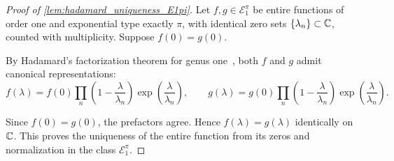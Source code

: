 \begin{proof}[Proof of \cref{lem:hadamard_uniqueness_E1pi}]
Let \( f, g \in \mathcal{E}_1^\pi \) be entire functions of order one and exponential type exactly \( \pi \), with identical zero sets \( \{ \lambda_n \} \subset \mathbb{C} \), counted with multiplicity. Suppose \( f(0) = g(0) \).

\medskip

By Hadamard’s factorization theorem for genus one~\cite[Ch.~1, Thm.~11]{Levin1996EntireLectures}, both \( f \) and \( g \) admit canonical representations:
\[
f(\lambda) = f(0) \prod_n \left( 1 - \frac{\lambda}{\lambda_n} \right) \exp\left( \frac{\lambda}{\lambda_n} \right), \qquad
g(\lambda) = g(0) \prod_n \left( 1 - \frac{\lambda}{\lambda_n} \right) \exp\left( \frac{\lambda}{\lambda_n} \right).
\]

Since \( f(0) = g(0) \), the prefactors agree. Hence \( f(\lambda) = g(\lambda) \) identically on \( \mathbb{C} \). This proves the uniqueness of the entire function from its zeros and normalization in the class \( \mathcal{E}_1^\pi \).
\end{proof}
